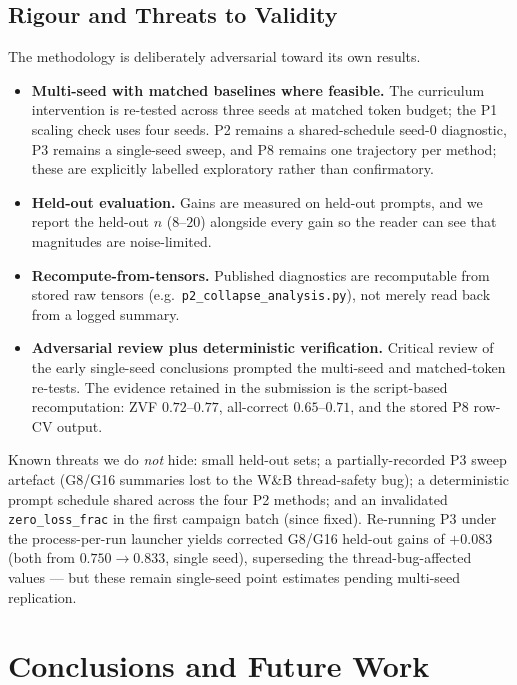 \documentclass[12pt,a4paper]{report}
\begin{document}
\section{Rigour and Threats to Validity}
\label{sec:rigor}
The methodology is deliberately adversarial toward its own results.
\begin{itemize}[leftmargin=1.4em,itemsep=2pt]
  \item \textbf{Multi-seed with matched baselines where feasible.} The curriculum
  intervention is re-tested across three seeds at matched token budget; the P1
  scaling check uses four seeds. P2 remains a shared-schedule seed-0 diagnostic, P3
  remains a single-seed sweep, and P8 remains one trajectory per method; these are
  explicitly labelled exploratory rather than confirmatory.
  \item \textbf{Held-out evaluation.} Gains are measured on held-out prompts, and we
  report the held-out $n$ ($8$--$20$) alongside every gain so the reader can see that
  magnitudes are noise-limited.
  \item \textbf{Recompute-from-tensors.} Published diagnostics are recomputable from
  stored raw tensors (e.g.\ \texttt{p2\_collapse\_analysis.py}), not merely read back
  from a logged summary.
  \item \textbf{Adversarial review plus deterministic verification.} Critical review
  of the early single-seed conclusions prompted the multi-seed and matched-token
  re-tests. The evidence retained in the submission is the script-based recomputation:
  ZVF $0.72$--$0.77$, all-correct $0.65$--$0.71$, and the stored P8 row-CV output.
\end{itemize}
Known threats we do \emph{not} hide: small held-out sets; a partially-recorded P3
sweep artefact (G8/G16 summaries lost to the W\&B thread-safety bug); a deterministic
prompt schedule shared across the four P2 methods; and an invalidated
\texttt{zero\_loss\_frac} in the first campaign batch (since fixed). Re-running P3
under the process-per-run launcher yields corrected G8/G16 held-out gains of
$+0.083$ (both from $0.750\to0.833$, single seed), superseding the thread-bug-affected
values --- but these remain single-seed point estimates pending multi-seed
replication.

\chapter{Conclusions and Future Work}
\label{ch:conclusion}
\end{document}
